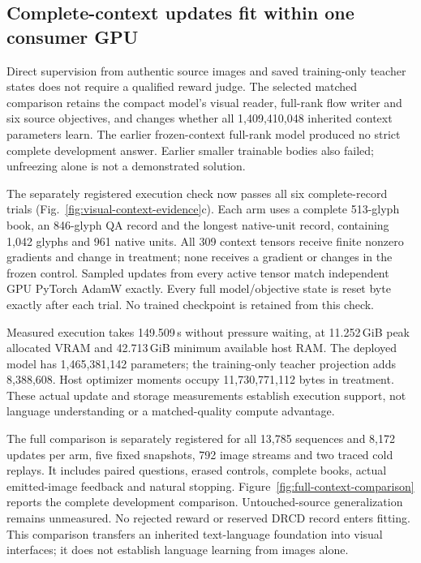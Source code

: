 \subsection*{Complete-context updates fit within one consumer GPU}

Direct supervision from authentic source images and saved training-only teacher
states does not require a qualified reward judge. The selected matched
comparison retains the compact model's visual reader, full-rank flow writer and
six source objectives, and changes whether all 1,409,410,048 inherited context
parameters learn. The earlier frozen-context full-rank model produced no strict
complete development answer. Earlier smaller trainable bodies also failed;
unfreezing alone is not a demonstrated solution.

The separately registered execution check now passes all six complete-record
trials (Fig.~\ref{fig:visual-context-evidence}c). Each arm uses a complete
513-glyph book, an 846-glyph QA record and the longest native-unit record,
containing 1,042 glyphs and 961 native units. All 309 context tensors receive
finite nonzero gradients and change in treatment; none receives a gradient or
changes in the frozen control. Sampled updates from every active tensor match
independent GPU PyTorch AdamW exactly. Every full model/objective state is reset
byte exactly after each trial. No trained checkpoint is retained from this check.

Measured execution takes 149.509\,s without pressure waiting, at 11.252\,GiB peak
allocated VRAM and 42.713\,GiB minimum available host RAM. The deployed model has
1,465,381,142 parameters; the training-only teacher projection adds 8,388,608.
Host optimizer moments occupy 11,730,771,112 bytes in treatment. These actual
update and storage measurements establish execution support, not language
understanding or a matched-quality compute advantage.

The full comparison is separately registered for all 13,785 sequences and
8,172 updates per arm, five fixed snapshots, 792 image streams and two traced
cold replays. It includes paired questions, erased controls, complete books,
actual emitted-image feedback and natural stopping. Figure~\ref{fig:full-context-comparison} reports the complete development
comparison. Untouched-source generalization remains unmeasured. No rejected
reward or reserved DRCD record enters fitting. This comparison transfers an
inherited text-language foundation into visual interfaces; it does not establish
language learning from images alone.
